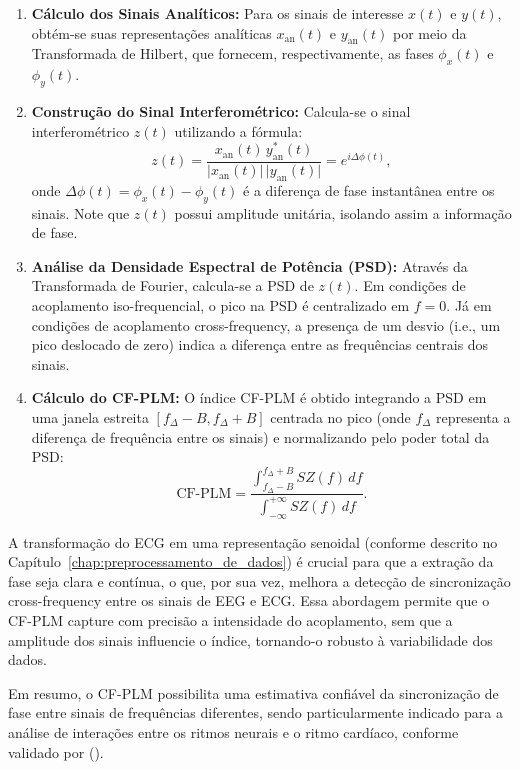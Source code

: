 \begin{enumerate}
    \item \textbf{Cálculo dos Sinais Analíticos:} Para os sinais de interesse \(x(t)\) e \(y(t)\), obtém-se suas representações analíticas \(x_{\mathrm{an}}(t)\) e \(y_{\mathrm{an}}(t)\) por meio da Transformada de Hilbert, que fornecem, respectivamente, as fases \(\phi_x(t)\) e \(\phi_y(t)\).
    \item \textbf{Construção do Sinal Interferométrico:} Calcula-se o sinal interferométrico \(z(t)\) utilizando a fórmula:
    \[
    z(t) = \frac{x_{\mathrm{an}}(t)\, y_{\mathrm{an}}^*(t)}{\lvert x_{\mathrm{an}}(t)\rvert\, \lvert y_{\mathrm{an}}(t)\rvert} = e^{i\Delta \phi(t)},
    \]
    onde \(\Delta \phi(t) = \phi_x(t) - \phi_y(t)\) é a diferença de fase instantânea entre os sinais. Note que \(z(t)\) possui amplitude unitária, isolando assim a informação de fase.
    \item \textbf{Análise da Densidade Espectral de Potência (PSD):} Através da Transformada de Fourier, calcula-se a PSD de \(z(t)\). Em condições de acoplamento iso-frequencial, o pico na PSD é centralizado em \(f = 0\). Já em condições de acoplamento cross-frequency, a presença de um desvio (i.e., um pico deslocado de zero) indica a diferença entre as frequências centrais dos sinais.
    \item \textbf{Cálculo do CF-PLM:} O índice CF-PLM é obtido integrando a PSD em uma janela estreita \([f_\Delta - B, f_\Delta + B]\) centrada no pico (onde \(f_\Delta\) representa a diferença de frequência entre os sinais) e normalizando pelo poder total da PSD:
    \[
    \text{CF-PLM} = \frac{\displaystyle\int_{f_\Delta - B}^{f_\Delta + B} SZ(f) \, df}{\displaystyle\int_{-\infty}^{+\infty} SZ(f) \, df}.
    \]
\end{enumerate}

A transformação do ECG em uma representação senoidal (conforme descrito no Capítulo~\ref{chap:preprocessamento_de_dados}) é crucial para que a extração da fase seja clara e contínua, o que, por sua vez, melhora a detecção de sincronização cross-frequency entre os sinais de EEG e ECG. Essa abordagem permite que o CF-PLM capture com precisão a intensidade do acoplamento, sem que a amplitude dos sinais influencie o índice, tornando-o robusto à variabilidade dos dados.

Em resumo, o CF-PLM possibilita uma estimativa confiável da sincronização de fase entre sinais de frequências diferentes, sendo particularmente indicado para a análise de interações entre os ritmos neurais e o ritmo cardíaco, conforme validado por \citeauthor{sorrentino2022} (\citeyear{sorrentino2022}).

